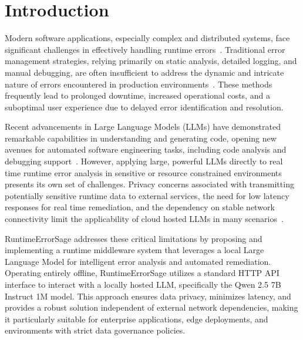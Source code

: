 \section{Introduction}
Modern software applications, especially complex and distributed systems, face significant challenges in effectively handling runtime errors~\cite{dist_systems_errors_2018, microservices_challenges_2020, runtime_error_analysis_2023, error_handling_survey_2024}. Traditional error management strategies, relying primarily on static analysis, detailed logging, and manual debugging, are often insufficient to address the dynamic and intricate nature of errors encountered in production environments~\cite{debugging_complex_systems_2021, runtime_debugging_challenges_2023, error_recovery_survey_2024}. These methods frequently lead to prolonged downtime, increased operational costs, and a suboptimal user experience due to delayed error identification and resolution.

Recent advancements in Large Language Models (LLMs) have demonstrated remarkable capabilities in understanding and generating code, opening new avenues for automated software engineering tasks, including code analysis and debugging support~\cite{llm_code_generation_2022, llm_debugging_2023, llm_software_engineering_2024, local_llm_applications_2024}. However, applying large, powerful LLMs directly to real time runtime error analysis in sensitive or resource constrained environments presents its own set of challenges. Privacy concerns associated with transmitting potentially sensitive runtime data to external services, the need for low latency responses for real time remediation, and the dependency on stable network connectivity limit the applicability of cloud hosted LLMs in many scenarios~\cite{privacy_llm_challenges_2023, edge_ai_challenges_2019, local_llm_security_2024, runtime_llm_optimization_2024}.

RuntimeErrorSage addresses these critical limitations by proposing and implementing a runtime middleware system that leverages a local Large Language Model for intelligent error analysis and automated remediation. Operating entirely offline, RuntimeErrorSage utilizes a standard HTTP API interface to interact with a locally hosted LLM, specifically the Qwen 2.5 7B Instruct 1M model. This approach ensures data privacy, minimizes latency, and provides a robust solution independent of external network dependencies, making it particularly suitable for enterprise applications, edge deployments, and environments with strict data governance policies.


